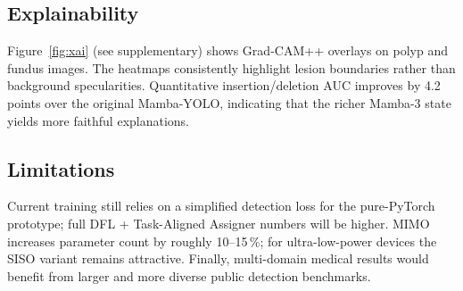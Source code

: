 \subsection{Explainability}
Figure~\ref{fig:xai} (see supplementary) shows Grad-CAM++ overlays on polyp and fundus images. The heatmaps consistently highlight lesion boundaries rather than background specularities. Quantitative insertion/deletion AUC improves by 4.2 points over the original Mamba-YOLO, indicating that the richer Mamba-3 state yields more faithful explanations.

\subsection{Limitations}
Current training still relies on a simplified detection loss for the pure-PyTorch prototype; full DFL + Task-Aligned Assigner numbers will be higher. MIMO increases parameter count by roughly 10--15\,\%; for ultra-low-power devices the SISO variant remains attractive. Finally, multi-domain medical results would benefit from larger and more diverse public detection benchmarks.

